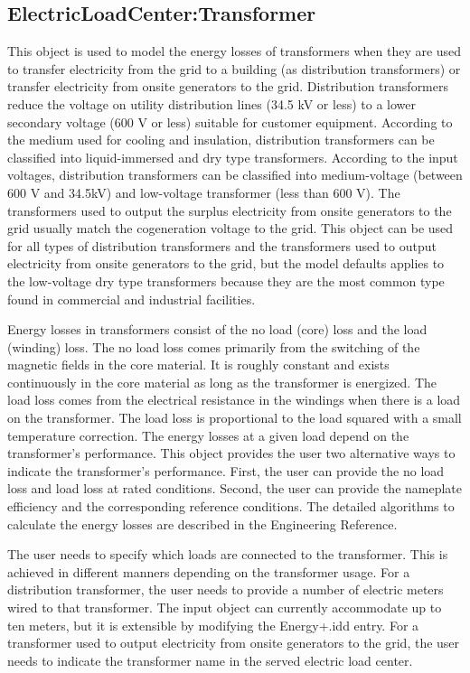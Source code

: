 \subsection{ElectricLoadCenter:Transformer}\label{electricloadcentertransformer}

This object is used to model the energy losses of transformers when they are used to transfer electricity from the grid to a building (as distribution transformers) or transfer electricity from onsite generators to the grid. Distribution transformers reduce the voltage on utility distribution lines (34.5 kV or less) to a lower secondary voltage (600 V or less) suitable for customer equipment. According to the medium used for cooling and insulation, distribution transformers can be classified into liquid-immersed and dry type transformers. According to the input voltages, distribution transformers can be classified into medium-voltage (between 600 V and 34.5kV) and low-voltage transformer (less than 600 V). The transformers used to output the surplus electricity from onsite generators to the grid usually match the cogeneration voltage to the grid. This object can be used for all types of distribution transformers and the transformers used to output electricity from onsite generators to the grid, but the model defaults applies to the low-voltage dry type transformers because they are the most common type found in commercial and industrial facilities.

Energy losses in transformers consist of the no load (core) loss and the load (winding) loss. The no load loss comes primarily from the switching of the magnetic fields in the core material. It is roughly constant and exists continuously in the core material as long as the transformer is energized. The load loss comes from the electrical resistance in the windings when there is a load on the transformer. The load loss is proportional to the load squared with a small temperature correction. The energy losses at a given load depend on the transformer's performance. This object provides the user two alternative ways to indicate the transformer's performance. First, the user can provide the no load loss and load loss at rated conditions. Second, the user can provide the nameplate efficiency and the corresponding reference conditions. The detailed algorithms to calculate the energy losses are described in the Engineering Reference.

The user needs to specify which loads are connected to the transformer. This is achieved in different manners depending on the transformer usage. For a distribution transformer, the user needs to provide a number of electric meters wired to that transformer. The input object can currently accommodate up to ten meters, but it is extensible by modifying the Energy+.idd entry. For a transformer used to output electricity from onsite generators to the grid, the user needs to indicate the transformer name in the served electric load center.


